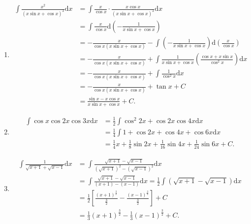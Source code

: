 \begin{solution}
\begin{enumerate}
        \item \begin{align*}
                  \int \frac{x^2}{(x \sin x + \cos x)^2} \mathrm{d}x
                   & = \int \frac{x}{\cos x} \cdot \frac{x \cos x}{(x \sin x + \cos x)^2} \mathrm{d}x                                                       \\
                   & = \int \frac{x}{\cos x} \mathrm{d}\left(-\frac{1}{x \sin x + \cos x}\right)                                                            \\
                   & = -\frac{x}{\cos x (x \sin x + \cos x)} - \int \left(-\frac{1}{x \sin x + \cos x}\right) \mathrm{d}\left(\frac{x}{\cos x}\right)       \\
                   & = -\frac{x}{\cos x (x \sin x + \cos x)} + \int \frac{1}{x \sin x + \cos x} \left(\frac{\cos x + x \sin x}{\cos^2 x}\right) \mathrm{d}x \\
                   & = -\frac{x}{\cos x (x \sin x + \cos x)} + \int \frac{1}{\cos^2 x} \mathrm{d}x                                                          \\
                   & = -\frac{x}{\cos x (x \sin x + \cos x)} + \tan x + C                                                                                   \\
                   & = \frac{\sin x - x \cos x}{x \sin x + \cos x} + C.
              \end{align*}

        \item \begin{align*}
                  \int \cos x \cos 2x \cos 3x \mathrm{d}x & = \frac{1}{2} \int \cos^2 2x + \cos 2x \cos 4x \mathrm{d}x                               \\
                                                          & = \frac{1}{4} \int 1 + \cos 2x + \cos 4x + \cos 6x \mathrm{d}x                           \\
                                                          & = \frac{1}{4} x + \frac{1}{8} \sin 2x + \frac{1}{16} \sin 4x + \frac{1}{24} \sin 6x + C.
              \end{align*}

        \item \begin{align*}
                  \int \frac{1}{\sqrt{x + 1} + \sqrt{x - 1}} \mathrm{d}x
                   & = \int \frac{\sqrt{x + 1} - \sqrt{x - 1}}{(\sqrt{x + 1})^2 - (\sqrt{x - 1})^2} \mathrm{d}x                                            \\
                   & = \int \frac{\sqrt{x + 1} - \sqrt{x - 1}}{(x + 1) - (x - 1)} \mathrm{d}x = \frac{1}{2} \int (\sqrt{x + 1} - \sqrt{x - 1}) \mathrm{d}x \\
                   & = \frac{1}{2} \left[ \frac{(x + 1)^{\frac{3}{2}}}{\frac{3}{2}} - \frac{(x - 1)^{\frac{3}{2}}}{\frac{3}{2}} \right] + C                \\
                   & = \frac{1}{3} (x + 1)^{\frac{3}{2}} - \frac{1}{3} (x - 1)^{\frac{3}{2}} + C.
              \end{align*}


\end{enumerate}
\end{solution}
